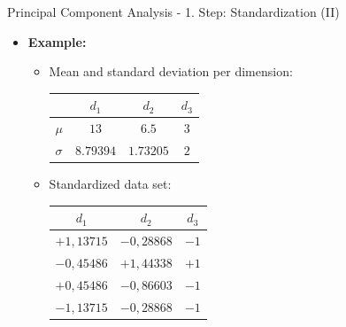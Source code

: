 \begin{frame}{Principal Component Analysis - 1. Step: Standardization (II)}
	\begin{itemize}
		\item \textbf{Example:}
		\begin{itemize}
			\item Mean and standard deviation per dimension: \\
			\vspace{3mm}
			\begin{center}
				\centering
				\begin{tabular}{|l|c|c|c|}
					\hline
								& $d_1$ 	& $d_2$ 	& $d_3$
					\\\hline
					$\mu$		& $13$		& $6.5$ 	& $3$                   
					\\\hline
					$\sigma$	& $8.79394$	& $1.73205$ & 
					$2$                    
					\\\hline
				\end{tabular}
			\end{center}
			\vspace{3mm}
			\item Standardized data set: \\
			\vspace{3mm}
			\begin{center}
				\centering
				\begin{tabular}{|c|c|c|}
					\hline
					$d_1$ 	& $d_2$ 	& $d_3$
					\\\hline
					$+1,13715$	& $-0,28868$ 		& $-1$                   
					\\\hline
					$-0,45486$		& $+1,44338$ 		& $+1$                
					\\\hline
					$+0,45486$	& $-0,86603$ 		& $-1$         
					\\\hline
					$-1,13715$		& $-0,28868$ 		& $-1$         
					\\\hline
				\end{tabular}
			\end{center}
		\end{itemize}
	\end{itemize}
\end{frame}


